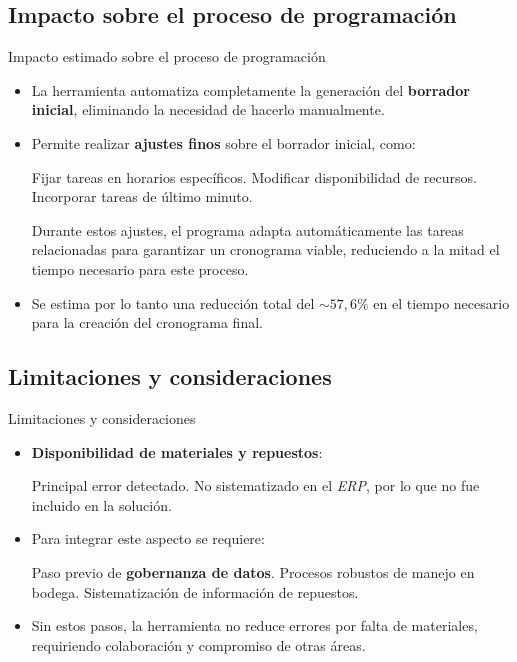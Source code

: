 \documentclass[pdfpagelabels=false, usepdftitle=false, aspectratio=169]{beamer}
\begin{document}
\subsection{Impacto sobre el proceso de programación}
\begin{frame}{Impacto estimado sobre el proceso de programación}
\begin{itemize}
    \item La herramienta automatiza completamente la generación del \textbf{borrador inicial}, eliminando la necesidad de hacerlo manualmente.
    \vfill
    \item Permite realizar \textbf{ajustes finos} sobre el borrador inicial, como:
    \begin{itemize}
        \arrowitem Fijar tareas en horarios específicos.
        \arrowitem Modificar disponibilidad de recursos.
        \arrowitem Incorporar tareas de último minuto.
    \end{itemize}
    Durante estos ajustes, el programa adapta automáticamente las tareas relacionadas para garantizar un cronograma viable, reduciendo a la mitad el tiempo necesario para este proceso.
    \vfill
    \item Se estima por lo tanto una reducción total del \(\sim57,6\%\) en el tiempo necesario para la creación del cronograma final.
\end{itemize}
\vfill
\end{frame}

\subsection{Limitaciones y consideraciones}
\begin{frame}{Limitaciones y consideraciones}
\begin{itemize}
    \item \textbf{Disponibilidad de materiales y repuestos}:
    \begin{itemize}
        \arrowitem Principal error detectado.
        \arrowitem No sistematizado en el \textit{ERP}, por lo que no fue incluido en la solución.
    \end{itemize}
    \vfill
    \item Para integrar este aspecto se requiere:
    \begin{itemize}
        \arrowitem Paso previo de \textbf{gobernanza de datos}.
        \arrowitem Procesos robustos de manejo en bodega.
        \arrowitem Sistematización de información de repuestos.
    \end{itemize}
    \vfill
    \item Sin estos pasos, la herramienta no reduce errores por falta de materiales,
    requiriendo colaboración y compromiso de otras áreas.
\end{itemize}
\vfill
\end{frame}
\end{document}
